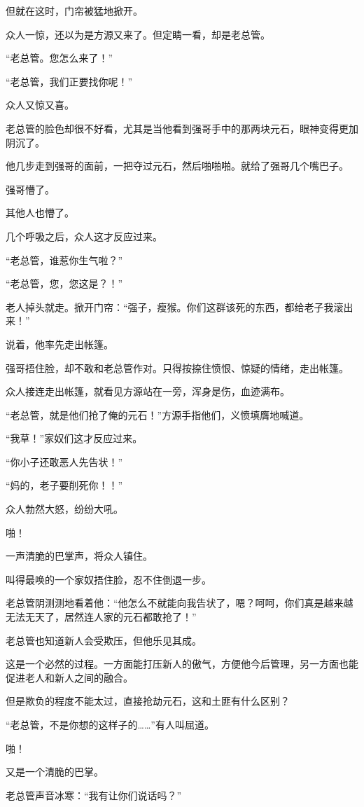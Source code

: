 \begin{this_body}
但就在这时，门帘被猛地掀开。

众人一惊，还以为是方源又来了。但定睛一看，却是老总管。

“老总管。您怎么来了！”

“老总管，我们正要找你呢！”

众人又惊又喜。

老总管的脸色却很不好看，尤其是当他看到强哥手中的那两块元石，眼神变得更加阴沉了。

他几步走到强哥的面前，一把夺过元石，然后啪啪啪。就给了强哥几个嘴巴子。

强哥懵了。

其他人也懵了。

几个呼吸之后，众人这才反应过来。

“老总管，谁惹你生气啦？”

“老总管，您，您这是？！”

老人掉头就走。掀开门帘：“强子，瘦猴。你们这群该死的东西，都给老子我滚出来！”

说着，他率先走出帐篷。

强哥捂住脸，却不敢和老总管作对。只得按捺住愤恨、惊疑的情绪，走出帐篷。

众人接连走出帐篷，就看见方源站在一旁，浑身是伤，血迹满布。

“老总管，就是他们抢了俺的元石！”方源手指他们，义愤填膺地喊道。

“我草！”家奴们这才反应过来。

“你小子还敢恶人先告状！”

“妈的，老子要削死你！！”

众人勃然大怒，纷纷大吼。

啪！

一声清脆的巴掌声，将众人镇住。

叫得最唤的一个家奴捂住脸，忍不住倒退一步。

老总管阴测测地看着他：“他怎么不就能向我告状了，嗯？呵呵，你们真是越来越无法无天了，居然连人家的元石都敢抢了！”

老总管也知道新人会受欺压，但他乐见其成。

这是一个必然的过程。一方面能打压新人的傲气，方便他今后管理，另一方面也能促进老人和新人之间的融合。

但是欺负的程度不能太过，直接抢劫元石，这和土匪有什么区别？

“老总管，不是你想的这样子的……”有人叫屈道。

啪！

又是一个清脆的巴掌。

老总管声音冰寒：“我有让你们说话吗？”


\end{this_body}
